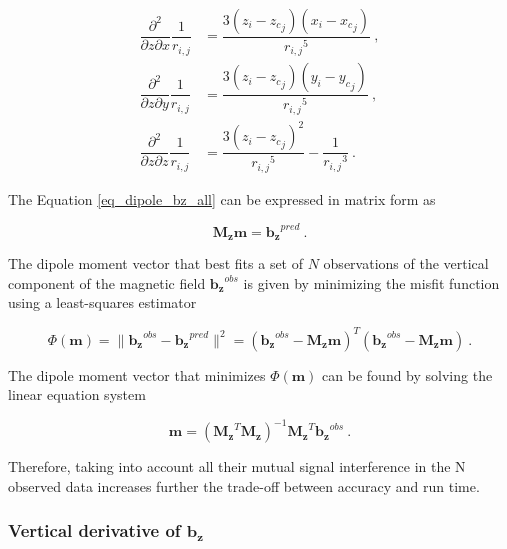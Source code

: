 \begin{equation}
\begin{aligned}
\dfrac{\partial^2}{\partial z \partial x} \dfrac{1}{r_{i,j}} &=
\dfrac{3(z_i - {z_c}_j)(x_i - {x_c}_j)}{{r_{i,j}}^5}\ ,
\\
\dfrac{\partial^2}{\partial z \partial y} \dfrac{1}{r_{i,j}} &=
\dfrac{3(z_i - {z_c}_j)(y_i - {y_c}_j)}{{r_{i,j}}^5}\ ,
\\
\dfrac{\partial^2}{\partial z \partial z} \dfrac{1}{r_{i,j}} &=
\dfrac{3(z_i - {z_c}_j)^2}{{r_{i,j}}^5} - \dfrac{1}{{r_{i,j}}^3}\ .
\end{aligned}
\end{equation}   \bigskip

The Equation \ref{eq_dipole_bz_all} can be expressed in matrix form as

\begin{equation}
\label{qdhqM4s9Ln}
\mathbf{M_z} \mathbf{m} = \mathbf{b_z}^{pred} \ .
\end{equation}

The dipole moment vector that best fits
a set of $N$ observations of the vertical component of the magnetic field
$\mathbf{b_z}^{obs}$ is given by minimizing the misfit function using a least-squares estimator

\begin{equation}
\label{uV9pRVYO4l}
\Phi (\mathbf{m}) = \| \mathbf{b_z}^{obs} - \mathbf{b_z}^{pred} \|^2 = (\mathbf{b_z}^{obs} - \mathbf{M_z}\mathbf{m})^T  (\mathbf{b_z}^{obs} - \mathbf{M_z}\mathbf{m})\ .
\end{equation}

The dipole moment vector that minimizes $\Phi (\mathbf{m})$ can be found by solving the linear equation system

\begin{equation}
 \mathbf{m} = {\left ( \mathbf{M_z}^T \mathbf{M_z} \right )}^{-1} \mathbf{M_z}^T\mathbf{b_z}^{obs}\ .
\end{equation}

Therefore, taking into account all their mutual signal interference in the N observed data increases further the trade-off between accuracy and run time.



\subsubsection{Vertical derivative of $\mathbf{b_z}$}


